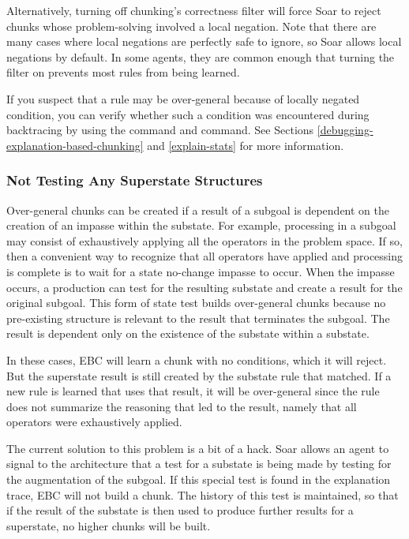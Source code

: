 Alternatively, turning off chunking's correctness filter  will force Soar to reject chunks whose problem-solving involved a local negation. Note that there are many cases where local negations are perfectly safe to ignore, so Soar allows local negations by default.  In some agents, they are common enough that turning the filter on prevents most rules from being learned.

If you suspect that a rule may be over-general because of locally negated condition, you can verify whether such a condition was encountered during backtracing by using the  command and  command.  See Sections \ref{debugging-explanation-based-chunking} and \ref{explain-stats} for more information.

\subsubsection{Not Testing Any Superstate Structures}
\label{CHUNKING-correctness-issues-exhaustion}

Over-general chunks can be created if a result of a subgoal is dependent on the creation of an impasse within the substate. For example, processing in a subgoal may consist of exhaustively applying all the operators in the problem space. If so, then a convenient way to recognize that all operators have applied and processing is complete is to wait for a state no-change impasse to occur. When the impasse occurs, a production can test for the resulting substate and create a result for the original subgoal. This form of state test builds over-general chunks because no pre-existing structure is relevant to the result that terminates the subgoal. The result is dependent only on the existence of the substate within a substate.

In these cases, EBC will learn a chunk with no conditions, which it will reject.  But the superstate result is still created by the substate rule that matched.  If a new rule is learned that uses that result, it will be over-general since the rule does not summarize the reasoning that led to the result, namely that all operators were exhaustively applied. 

The current solution to this problem is a bit of a hack.  Soar allows an agent to signal to the architecture that a test for a substate is being made by testing for the  augmentation of the subgoal. If this special test is found in the explanation trace, EBC will not build a chunk. The history of this test is maintained, so that if the result of the substate is then used to produce further results for a superstate, no higher chunks will be built. 

